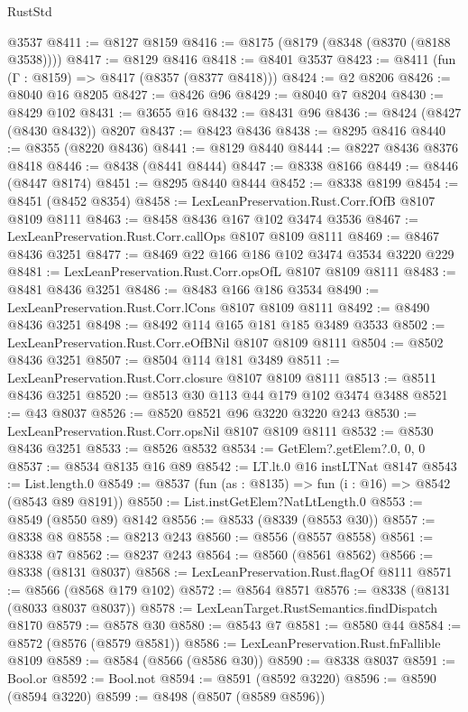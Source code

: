 \begin{lexlean}{RustStd}
\begin{coremodule}
    @3537
@8411 := @8127 @8159
@8416 := @8175 (@8179 (@8348 (@8370 (@8188 @3538))))
@8417 := @8129 @8416
@8418 := @8401 @3537
@8423 := @8411 (fun (Γ : @8159) => @8417 (@8357 (@8377 @8418)))
@8424 := @2 @8206
@8426 := @8040 @16 @8205
@8427 := @8426 @96
@8429 := @8040 @7 @8204
@8430 := @8429 @102
@8431 := @3655 @16
@8432 := @8431 @96
@8436 := @8424 (@8427 (@8430 @8432)) @8207
@8437 := @8423 @8436
@8438 := @8295 @8416
@8440 := @8355 (@8220 @8436)
@8441 := @8129 @8440
@8444 := @8227 @8436 @8376 @8418
@8446 := @8438 (@8441 @8444)
@8447 := @8338 @8166
@8449 := @8446 (@8447 @8174)
@8451 := @8295 @8440 @8444
@8452 := @8338 @8199
@8454 := @8451 (@8452 @8354)
@8458 := LexLeanPreservation.Rust.Corr.fOfB @8107 @8109 @8111
@8463 := @8458 @8436 @167 @102 @3474 @3536
@8467 := LexLeanPreservation.Rust.Corr.callOps @8107 @8109 @8111
@8469 := @8467 @8436 @3251
@8477 := @8469 @22 @166 @186 @102 @3474 @3534 @3220 @229
@8481 := LexLeanPreservation.Rust.Corr.opsOfL @8107 @8109 @8111
@8483 := @8481 @8436 @3251
@8486 := @8483 @166 @186 @3534
@8490 := LexLeanPreservation.Rust.Corr.lCons @8107 @8109 @8111
@8492 := @8490 @8436 @3251
@8498 := @8492 @114 @165 @181 @185 @3489 @3533
@8502 := LexLeanPreservation.Rust.Corr.eOfBNil @8107 @8109 @8111
@8504 := @8502 @8436 @3251
@8507 := @8504 @114 @181 @3489
@8511 := LexLeanPreservation.Rust.Corr.closure @8107 @8109 @8111
@8513 := @8511 @8436 @3251
@8520 := @8513 @30 @113 @44 @179 @102 @3474 @3488
@8521 := @43 @8037
@8526 := @8520 @8521 @96 @3220 @3220 @243
@8530 := LexLeanPreservation.Rust.Corr.opsNil @8107 @8109 @8111
@8532 := @8530 @8436 @3251
@8533 := @8526 @8532
@8534 := GetElem?.getElem?.{0, 0, 0}
@8537 := @8534 @8135 @16 @89
@8542 := LT.lt.{0} @16 instLTNat @8147
@8543 := List.length.{0}
@8549 := @8537 (fun (as : @8135) => fun (i : @16) => @8542 (@8543 @89 @8191))
@8550 := List.instGetElem?NatLtLength.{0}
@8553 := @8549 (@8550 @89) @8142
@8556 := @8533 (@8339 (@8553 @30))
@8557 := @8338 @8
@8558 := @8213 @243
@8560 := @8556 (@8557 @8558)
@8561 := @8338 @7
@8562 := @8237 @243
@8564 := @8560 (@8561 @8562)
@8566 := @8338 (@8131 @8037)
@8568 := LexLeanPreservation.Rust.flagOf @8111
@8571 := @8566 (@8568 @179 @102)
@8572 := @8564 @8571
@8576 := @8338 (@8131 (@8033 @8037 @8037))
@8578 := LexLeanTarget.RustSemantics.findDispatch @8170
@8579 := @8578 @30
@8580 := @8543 @7
@8581 := @8580 @44
@8584 := @8572 (@8576 (@8579 @8581))
@8586 := LexLeanPreservation.Rust.fnFallible @8109
@8589 := @8584 (@8566 (@8586 @30))
@8590 := @8338 @8037
@8591 := Bool.or
@8592 := Bool.not
@8594 := @8591 (@8592 @3220)
@8596 := @8590 (@8594 @3220)
@8599 := @8498 (@8507 (@8589 @8596))

\end{coremodule}
\end{lexlean}
